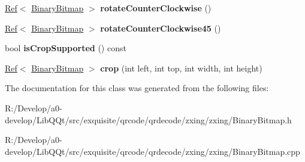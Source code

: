 \begin{DoxyCompactItemize}
\mbox{\hyperlink{classzxing_1_1_ref}{Ref}}$<$ \mbox{\hyperlink{classzxing_1_1_binary_bitmap}{Binary\+Bitmap}} $>$ {\bfseries rotate\+Counter\+Clockwise} ()
\item 
\mbox{\label{classzxing_1_1_binary_bitmap_a3993fca14ff8dbc0a5dc1f630900c7f3}} 
\mbox{\hyperlink{classzxing_1_1_ref}{Ref}}$<$ \mbox{\hyperlink{classzxing_1_1_binary_bitmap}{Binary\+Bitmap}} $>$ {\bfseries rotate\+Counter\+Clockwise45} ()
\item 
\mbox{\label{classzxing_1_1_binary_bitmap_a470e9ccbf19deefd2e60c0c68f36057e}} 
bool {\bfseries is\+Crop\+Supported} () const
\item 
\mbox{\label{classzxing_1_1_binary_bitmap_aaae54b8833e0c9c6c4b2e9105508df15}} 
\mbox{\hyperlink{classzxing_1_1_ref}{Ref}}$<$ \mbox{\hyperlink{classzxing_1_1_binary_bitmap}{Binary\+Bitmap}} $>$ {\bfseries crop} (int left, int top, int width, int height)
\end{DoxyCompactItemize}


The documentation for this class was generated from the following files\+:\begin{DoxyCompactItemize}
\item 
R\+:/\+Develop/a0-\/develop/\+Lib\+Q\+Qt/src/exquisite/qrcode/qrdecode/zxing/zxing/Binary\+Bitmap.\+h\item 
R\+:/\+Develop/a0-\/develop/\+Lib\+Q\+Qt/src/exquisite/qrcode/qrdecode/zxing/zxing/Binary\+Bitmap.\+cpp\end{DoxyCompactItemize}
